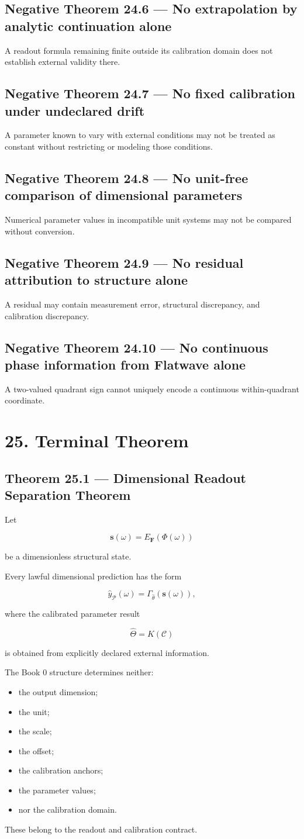 \documentclass[11pt,oneside,openany]{book}
\newcommand{\PCsection}[1]{%
  \section*{#1}\addcontentsline{toc}{section}{#1}%
}
\newcommand{\PCsubsection}[1]{%
  \subsection*{#1}%
}
\begin{document}
\PCsubsection{Negative Theorem 24.6 --- No extrapolation by analytic continuation alone}

A readout formula remaining finite outside its calibration domain does not establish external validity there.

\PCsubsection{Negative Theorem 24.7 --- No fixed calibration under undeclared drift}

A parameter known to vary with external conditions may not be treated as constant without restricting or modeling those conditions.

\PCsubsection{Negative Theorem 24.8 --- No unit-free comparison of dimensional parameters}

Numerical parameter values in incompatible unit systems may not be compared without conversion.

\PCsubsection{Negative Theorem 24.9 --- No residual attribution to structure alone}

A residual may contain measurement error, structural discrepancy, and calibration discrepancy.

\PCsubsection{Negative Theorem 24.10 --- No continuous phase information from Flatwave alone}

A two-valued quadrant sign cannot uniquely encode a continuous within-quadrant coordinate.


\PCsection{25. Terminal Theorem}

\PCsubsection{Theorem 25.1 --- Dimensional Readout Separation Theorem}

Let

\[
\mathbf s(\omega) = E_{\mathbf F}(\Phi(\omega))
\]

be a dimensionless structural state.

Every lawful dimensional prediction has the form

\[
\boxed{ \widehat y_{\mathcal P}(\omega) = \Gamma_{\widehat\theta} \left( \mathbf s(\omega) \right), }
\]

where the calibrated parameter result

\[
\widehat\Theta = K(\mathcal C)
\]

is obtained from explicitly declared external information.

The Book 0 structure determines neither:

\begin{itemize}
\item the output dimension;
\item the unit;
\item the scale;
\item the offset;
\item the calibration anchors;
\item the parameter values;
\item nor the calibration domain.
\end{itemize}
These belong to the readout and calibration contract.
\end{document}
